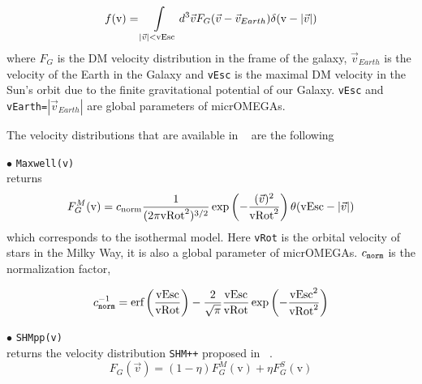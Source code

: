 \documentclass[12pt,a4paper]{article}
\begin{document}
\begin{equation} 
f(\mbox{v})=  \int\limits_{|\vec{v}|<\rm{vEsc}} d^3\vec{v} F_G(\vec{v} -\vec{v}_{Earth})
\delta(\mbox{v} -|\vec{v}|) 
\end{equation}
where $F_G$ is the DM velocity distribution in the  frame of the galaxy, $\vec{v}_{Earth}$ is the velocity of the
Earth in the Galaxy and {\tt vEsc} is the maximal DM velocity in the Sun's orbit due to the
finite gravitational potential of our Galaxy. {\tt vEsc} and {\tt vEarth=}$|\vec{v}_{Earth}|$ are global
parameters of micrOMEGAs. 

The velocity distributions that are available  in \micro~ are the following

\noindent
$\bullet$ \verb|Maxwell(v)| \\
returns   
\begin{equation}
F_G^M(\mbox{v})=  c_{\rm{norm}} \frac{1}{(2\pi \rm{vRot}^2)^{3/2}} \exp\left(
-\frac{(\vec{v})^2}{\rm{vRot}^2}\right)\theta(\mbox{vEsc} -|\vec{v}|)
\end{equation}
which corresponds to the isothermal model. Here  {\tt vRot} is the orbital velocity of stars in the Milky Way, it is also a  global 
parameter of micrOMEGAs. $c_{\tt norm}$ is the normalization factor,

\begin{equation}
c_{\tt norm}^{-1}=  {\mbox{erf}}\left(\frac{\mbox{vEsc}}{\rm{vRot}} \right) -\frac{2}{\sqrt{\pi}} \frac{\mbox{vEsc}}{\rm{vRot}} \exp\left( -\frac{\mbox{vEsc}^2}{\rm{vRot}^2}\right)
\end{equation} 

\noindent
$\bullet$ \verb|SHMpp(v)|\\
returns the  velocity distribution {\tt SHM++}  proposed in ~\cite{Evans:2018bqy}.
\begin{equation}
F_G(\vec{v}) = (1-\eta) F_G^M(\mbox{v}) +\eta F_G^S(\mbox{v})
\end{equation}
\end{document}
